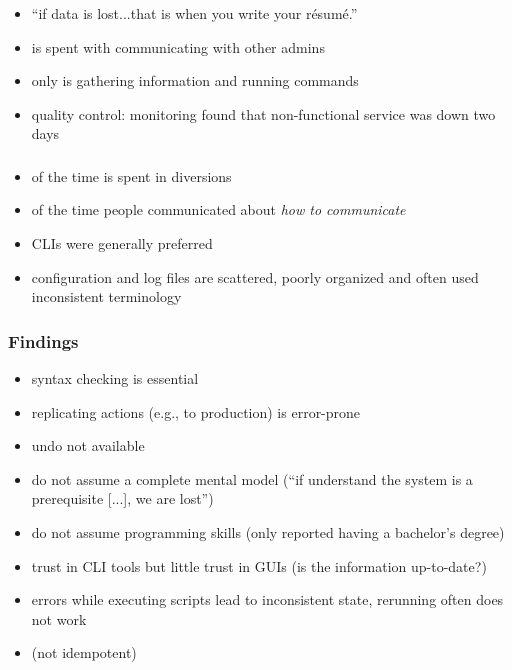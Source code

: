 \begin{frame}
	\frametitle{\citet{haber2007design}}

	\begin{itemize}[<+-| alert@+>]
	\item ``if data is lost...that is when you write your résumé.''
	\item {} is spent with communicating with other admins
	\item only  is gathering information and running commands
	\item quality control: monitoring found that non-functional service was down two days
	\end{itemize}
\end{frame}


\begin{frame}
	\frametitle{\citet{barrett2004field}}

	\begin{itemize}[<+-| alert@+>]
	\item {} of the time is spent in diversions
	\item {} of the time people communicated about \emph{how to communicate}
	\item CLIs were generally preferred
	\item configuration and log files are scattered, poorly organized and often used inconsistent terminology
	\end{itemize}
\end{frame}


\begin{frame}
	\frametitle{Findings \cite{barrett2004field}}

	\begin{itemize}[<+-| alert@+>]
	\item syntax checking is essential
	\item replicating actions (e.g., to production) is error-prone
	\item undo not available
	\item do not assume a complete mental model (``if understand the system is a prerequisite [...], we are lost'')
	\item do not assume programming skills (only  reported having a bachelor's degree)
	\item trust in CLI tools but little trust in GUIs (is the information up-to-date?)
	\item errors while executing scripts lead to inconsistent state, rerunning often does not work
	\item[] (not idempotent)
	\end{itemize}
\end{frame}

